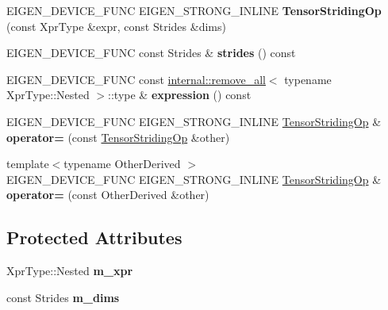 \begin{DoxyCompactItemize}
E\+I\+G\+E\+N\+\_\+\+D\+E\+V\+I\+C\+E\+\_\+\+F\+U\+NC E\+I\+G\+E\+N\+\_\+\+S\+T\+R\+O\+N\+G\+\_\+\+I\+N\+L\+I\+NE {\bfseries Tensor\+Striding\+Op} (const Xpr\+Type \&expr, const Strides \&dims)
\item 
\mbox{\label{class_eigen_1_1_tensor_striding_op_a59900ba4516950cd185566e16233af0c}} 
E\+I\+G\+E\+N\+\_\+\+D\+E\+V\+I\+C\+E\+\_\+\+F\+U\+NC const Strides \& {\bfseries strides} () const
\item 
\mbox{\label{class_eigen_1_1_tensor_striding_op_a2a08564154c0867e3d3aaaaa7b1f90fc}} 
E\+I\+G\+E\+N\+\_\+\+D\+E\+V\+I\+C\+E\+\_\+\+F\+U\+NC const \hyperlink{struct_eigen_1_1internal_1_1remove__all}{internal\+::remove\+\_\+all}$<$ typename Xpr\+Type\+::\+Nested $>$\+::type \& {\bfseries expression} () const
\item 
\mbox{\label{class_eigen_1_1_tensor_striding_op_acc8d8f3210fb1aec8bb7b560489db228}} 
E\+I\+G\+E\+N\+\_\+\+D\+E\+V\+I\+C\+E\+\_\+\+F\+U\+NC E\+I\+G\+E\+N\+\_\+\+S\+T\+R\+O\+N\+G\+\_\+\+I\+N\+L\+I\+NE \hyperlink{class_eigen_1_1_tensor_striding_op}{Tensor\+Striding\+Op} \& {\bfseries operator=} (const \hyperlink{class_eigen_1_1_tensor_striding_op}{Tensor\+Striding\+Op} \&other)
\item 
\mbox{\label{class_eigen_1_1_tensor_striding_op_a15ecf899a28df80d1bd432e78ea4ba5b}} 
{\footnotesize template$<$typename Other\+Derived $>$ }\\E\+I\+G\+E\+N\+\_\+\+D\+E\+V\+I\+C\+E\+\_\+\+F\+U\+NC E\+I\+G\+E\+N\+\_\+\+S\+T\+R\+O\+N\+G\+\_\+\+I\+N\+L\+I\+NE \hyperlink{class_eigen_1_1_tensor_striding_op}{Tensor\+Striding\+Op} \& {\bfseries operator=} (const Other\+Derived \&other)
\end{DoxyCompactItemize}
\subsection*{Protected Attributes}
\begin{DoxyCompactItemize}
\item 
\mbox{\label{class_eigen_1_1_tensor_striding_op_a51767c9978bca654d680e5d77c01992d}} 
Xpr\+Type\+::\+Nested {\bfseries m\+\_\+xpr}
\item 
\mbox{\label{class_eigen_1_1_tensor_striding_op_a8cc0f8ec1affbee6105dbaae09201fe1}} 
const Strides {\bfseries m\+\_\+dims}
\end{DoxyCompactItemize}
